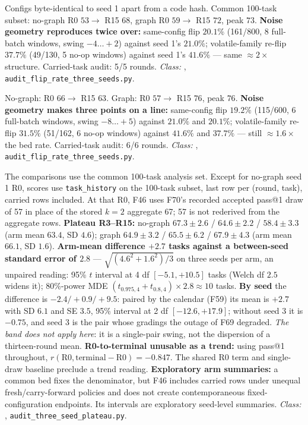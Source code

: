 \begin{description}[leftmargin=0pt,labelindent=0pt,labelsep=0pt,style=nextline,font=\normalfont,itemsep=6pt]
\item[\textbf{F44}\quad Replication, seed 2, both arms 16/16.]
Configs byte-identical to seed 1 apart from a code hash. Common
100-task subset: no-graph R0 $53 \to$ R15 $68$, graph R0 $59 \to$ R15
$72$, peak $73$. \textbf{Noise geometry reproduces twice over:}
same-config flip $20.1\%$ (161/800, 8 full-batch windows, swing
$-4\ldots{+}2$) against seed 1's $21.0\%$; volatile-family re-flip
$37.7\%$ (49/130, 5 no-op windows) against seed 1's $41.6\%$ --- same
$\approx 2\times$ structure. Carried-task audit: 5/5 rounds. \emph{Class:} ,
\texttt{audit\_flip\_rate\_three\_seeds.py}.

\item[\textbf{F45}\quad Replication, seed 3, both arms 16/16.]
No-graph: R0 $66 \to$ R15 $63$. Graph: R0 $57 \to$ R15 $76$, peak $76$.
\textbf{Noise geometry makes three points on a line:} same-config flip
$19.2\%$ (115/600, 6 full-batch windows, swing $-8\ldots{+}5$) against
$21.0\%$ and $20.1\%$; volatile-family re-flip $31.5\%$ (51/162, 6
no-op windows) against $41.6\%$ and $37.7\%$ --- still
$\approx 1.6\times$ the bed rate. Carried-task audit: 6/6 rounds. \emph{Class:} ,
\texttt{audit\_flip\_rate\_three\_seeds.py}.

\item[\textbf{F46}\quad Three seeds $\times$ two arms on one bed.]
The comparisons use the common 100-task analysis set. Except for
no-graph seed 1 R0, scores use \texttt{task\_history} on the 100-task subset,
last row per (round, task), carried rows included. At that R0, F46 uses F70's
recorded accepted pass@1 draw of 57 in place of the stored $k{=}2$ aggregate
67; 57 is not rederived from the aggregate rows. \textbf{Plateau R3--R15:} no-graph
$67.3 \pm 2.6$ / $64.6 \pm 2.2$ / $58.4 \pm 3.3$ (arm mean $63.4$, SD
$4.6$); graph $64.9 \pm 3.2$ / $65.5 \pm 6.2$ / $67.9 \pm 4.3$ (arm mean
$66.1$, SD $1.6$). \textbf{Arm-mean difference $+2.7$ tasks against a
between-seed standard error of $2.8$} --- $\sqrt{(4.6^2+1.6^2)/3}$ on
three seeds per arm, an unpaired reading: 95\% $t$ interval at 4 df
$[-5.1, +10.5]$ tasks (Welch df $2.5$ widens it); 80\%-power MDE
$(t_{0.975,4} + t_{0.8,4}) \times 2.8 \approx 10$ tasks. \textbf{By seed}
the difference is $-2.4/+0.9/+9.5$: paired by the calendar (F59) its mean
is $+2.7$ with SD $6.1$ and SE $3.5$, 95\% interval at 2 df
$[-12.6, +17.9]$; without seed 3 it is $-0.75$, and seed 3 is the pair whose
gradings the outage of F69 degraded. \emph{The band does not apply here}:
it is a single-pair swing, not the dispersion of a thirteen-round mean.
\textbf{R0-to-terminal unusable as a trend:} using pass@1 throughout,
$r(\text{R0}, \text{terminal}-\text{R0})=-0.847$. The shared R0 term and
single-draw baseline preclude a trend reading.
\textbf{Exploratory arm summaries:} a common bed fixes the denominator, but
F46 includes carried rows under unequal fresh/carry-forward policies and does
not create contemporaneous fixed-configuration endpoints. Its intervals are
exploratory seed-level summaries. \emph{Class:} ,
\texttt{audit\_three\_seed\_plateau.py}.


\end{description}
